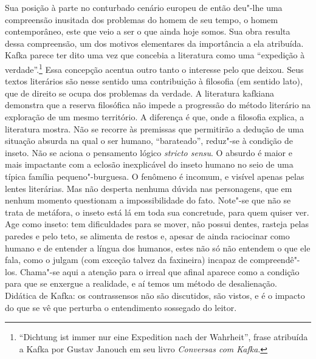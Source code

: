 Sua posição à parte no conturbado cenário europeu de então deu"-lhe uma
compreensão inusitada dos problemas do homem de seu tempo, o homem
contemporâneo, este que veio a ser o que ainda hoje somos. Sua obra
resulta dessa compreensão, um dos motivos elementares da importância a
ela atribuída. Kafka parece ter dito uma vez que concebia a literatura
como uma “expedição à verdade”.\footnote{ “Dichtung ist immer nur eine
Expedition nach der Wahrheit”, frase atribuída a Kafka por Gustav
Janouch em seu livro \textit{Conversas com Kafka}.} Essa concepção
acentua outro tanto o interesse pelo que deixou. Seus textos literários
são nesse sentido uma contribuição à filosofia (em sentido lato), que
de direito se ocupa dos problemas da verdade. A literatura kafkiana
demonstra que a reserva filosófica não impede a progressão do método
literário na exploração de um mesmo território. A diferença é que, onde
a filosofia explica, a literatura mostra. Não se recorre às premissas
que permitirão a dedução de uma situação absurda na qual o ser humano,
“barateado”, reduz"-se à condição de inseto. Não se aciona o
pensamento lógico \textit{stricto sensu}. O absurdo é maior e mais
impactante com a eclosão inexplicável do inseto humano no seio de uma
típica família pequeno"-burguesa. O fenômeno é incomum, e visível
apenas pelas lentes literárias. Mas não desperta nenhuma dúvida nas
personagens, que em nenhum momento questionam a impossibilidade do
fato. Note"-se que não se trata de metáfora, o inseto está lá em toda
sua concretude, para quem quiser ver. Age como inseto: tem dificuldades
para se mover, não possui dentes, rasteja pelas paredes e pelo teto,
se alimenta de restos e, apesar de ainda raciocinar como humano e de
entender a língua dos humanos, estes não só não entendem o que ele
fala, como o julgam (com exceção talvez da faxineira) incapaz de
compreendê"-los. Chama"-se aqui a atenção para o irreal que afinal
aparece como a condição para que se enxergue a realidade, e aí temos um
método de desalienação. Didática de Kafka: os contrassensos não são
discutidos, são vistos, e é o impacto do que se vê que perturba o
entendimento sossegado do leitor.

